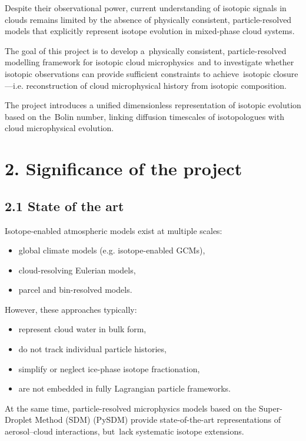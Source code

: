 \documentclass[11pt,a4paper]{article}
\begin{document}
Despite their observational power, current understanding of isotopic signals in clouds remains limited by the absence of physically consistent, particle-resolved models that explicitly represent isotope evolution in mixed-phase cloud systems.

The goal of this project is to develop a physically consistent, particle-resolved modelling framework for isotopic cloud microphysics and to investigate whether isotopic observations can provide sufficient constraints to achieve isotopic closure—i.e. reconstruction of cloud microphysical history from isotopic composition.

The project introduces a unified dimensionless representation of isotopic evolution based on the Bolin number, linking diffusion timescales of isotopologues with cloud microphysical evolution.

\section*{2. Significance of the project}
\subsection*{2.1 State of the art}
Isotope-enabled atmospheric models exist at multiple scales:

\begin{itemize}
\item global climate models (e.g. isotope-enabled GCMs),


\item cloud-resolving Eulerian models,


\item parcel and bin-resolved models.


\end{itemize}
However, these approaches typically:

\begin{itemize}
\item represent cloud water in bulk form,


\item do not track individual particle histories,


\item simplify or neglect ice-phase isotope fractionation,


\item are not embedded in fully Lagrangian particle frameworks.


\end{itemize}
At the same time, particle-resolved microphysics models based on the Super-Droplet Method (SDM) (PySDM) provide state-of-the-art representations of aerosol–cloud interactions, but lack systematic isotope extensions.
\end{document}

